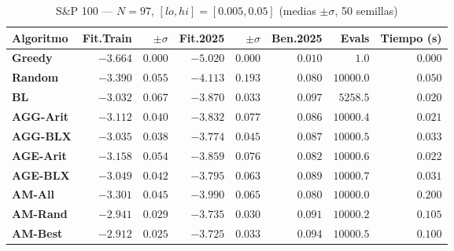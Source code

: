 \documentclass[12pt,a4paper]{article}
\begin{document}
\begin{table}[H]
\centering\footnotesize
\caption{S\&P 100 --- $N=97$, $[lo,hi]=[0.005,0.05]$ (medias $\pm\sigma$, 50 semillas)}
\begin{tabular}{lrrrrrr r}
\toprule
\textbf{Algoritmo} & \textbf{Fit.Train} & $\pm\sigma$ & \textbf{Fit.2025} & $\pm\sigma$ & \textbf{Ben.2025} & \textbf{Evals} & \textbf{Tiempo (s)} \\
\midrule
\textbf{Greedy}   & $-3.664$ & $0.000$ & $-5.020$ & $0.000$ & $0.010$ & $1.0$      & $0.000$ \\
\textbf{Random}   & $-3.390$ & $0.055$ & $-4.113$ & $0.193$ & $0.080$ & $10000.0$  & $0.050$ \\
\textbf{BL}       & $-3.032$ & $0.067$ & $-3.870$ & $0.033$ & $0.097$ & $5258.5$   & $0.020$ \\
\textbf{AGG-Arit} & $-3.112$ & $0.040$ & $-3.832$ & $0.077$ & $0.086$ & $10000.4$  & $0.021$ \\
\textbf{AGG-BLX}  & $-3.035$ & $0.038$ & $-3.774$ & $0.045$ & $0.087$ & $10000.5$  & $0.033$ \\
\textbf{AGE-Arit} & $-3.158$ & $0.054$ & $-3.859$ & $0.076$ & $0.082$ & $10000.6$  & $0.022$ \\
\textbf{AGE-BLX}  & $-3.049$ & $0.042$ & $-3.795$ & $0.063$ & $0.089$ & $10000.7$  & $0.031$ \\
\textbf{AM-All}   & $-3.301$ & $0.045$ & $-3.990$ & $0.065$ & $0.080$ & $10000.0$  & $0.200$ \\
\textbf{AM-Rand}  & $-2.941$ & $0.029$ & $-3.735$ & $0.030$ & $0.091$ & $10000.2$  & $0.105$ \\
\textbf{AM-Best}  & $-2.912$ & $0.025$ & $-3.725$ & $0.033$ & $0.094$ & $10000.5$  & $0.100$ \\
\bottomrule
\end{tabular}
\end{table}
\end{document}
